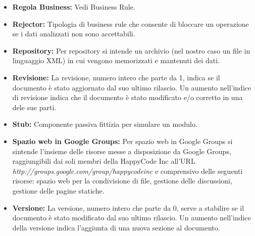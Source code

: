 \documentclass[11pt,titlepage,a4paper]{report}
\begin{document}
\begin{itemize}
\item{\textbf{Regola Business:}
Vedi Business Rule.}

\item{\textbf{Rejector:}
Tipologia di business rule che consente di bloccare un operazione se i dati analizzati non sono accettabili.}
 
\item{\textbf{Repository:}
Per repository si intende un archivio (nel nostro caso un file in linguaggio XML) in cui vengono memorizzati e mantenuti dei dati.}

\item{\textbf{Revisione:}
La revisione, numero intero che parte da 1,  indica se il documento \`e stato aggiornato dal suo ultimo rilascio. Un aumento nell'indice di revisione indica che il documento \`e stato modificato e/o corretto in una dele sue parti}.

\item{\textbf{Stub:}
Componente passiva fittizia per simulare un modulo.}

\item{\textbf{Spazio web in Google Groups:}
Per spazio web in Google Groups si sintende l'insieme delle risorse messe a disposizione da Google Groups, raggiungibili dai soli membri della HappyCode Inc all'URL\\ \textit{http://groups.google.com/group/happycodeinc} e comprensivo delle seguenti risorse: spazio web per la condivisione di file, gestione delle discussioni, gestione delle pagine statiche.}

\item{\textbf{Versione:}
La versione, numero intero che parte da 0, serve a stabilire se il documento \`e stato modificato dal suo ultimo rilascio. Un aumento nell'indice della versione indica l'aggiunta di  una nuova sezione al documento.}

\end{itemize}
\end{document}
